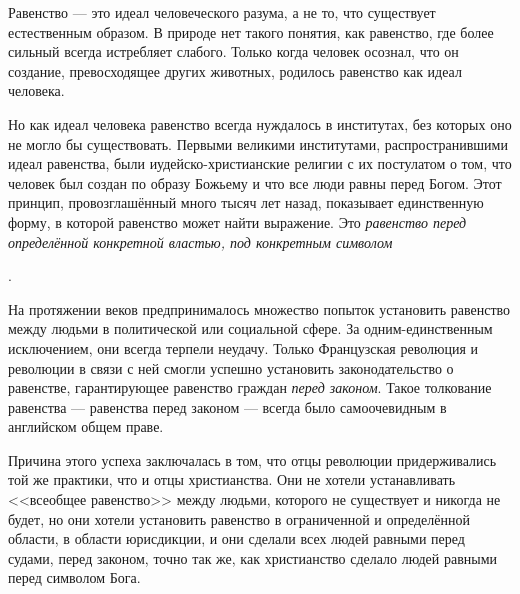 Равенство — это идеал человеческого разума, а не то, что существует естественным образом. В природе нет такого понятия, как равенство, где более сильный всегда истребляет слабого. Только когда человек осознал, что он создание, превосходящее других животных, родилось равенство как идеал человека.

Но как идеал человека равенство всегда нуждалось в институтах, без которых оно не могло бы существовать. Первыми великими институтами, распространившими идеал равенства, были иудейско-христианские религии с их постулатом о том, что человек был создан по образу Божьему и что все люди равны перед Богом. Этот принцип, провозглашённый много тысяч лет назад, показывает единственную форму, в которой равенство может найти выражение. Это \textit{равенство перед определённой конкретной властью, под конкретным символом}%
%

.

На протяжении веков предпринималось множество попыток установить равенство между людьми в политической или социальной сфере. За одним-единственным исключением, они всегда терпели неудачу. Только Французская революция и революции в связи с ней смогли успешно установить законодательство о равенстве, гарантирующее равенство граждан \textit{перед законом}. Такое толкование равенства — равенства перед законом — всегда было самоочевидным в английском общем праве.

Причина этого успеха заключалась в том, что отцы революции придерживались той же практики, что и отцы христианства. Они не хотели устанавливать <<всеобщее равенство>> между людьми, которого не существует и никогда не будет, но они хотели установить равенство в ограниченной и определённой области, в области юрисдикции, и они сделали всех людей равными перед судами, перед законом, точно так же, как христианство сделало людей равными перед символом Бога.

